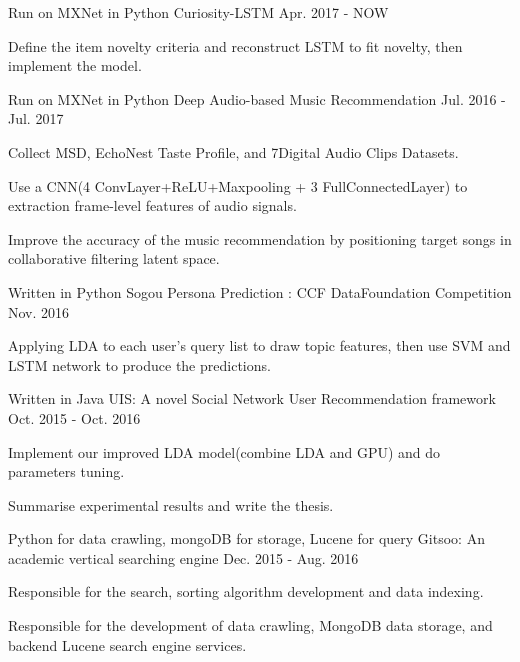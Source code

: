 \begin{cventries}
  \cventry
    {Run on MXNet in Python}
    {Curiosity-LSTM}
    {}
    {Apr. 2017 - NOW}
    {
      \begin{cvitems}
        \item {Define the item novelty criteria and reconstruct LSTM to fit novelty, then implement the model.}
      \end{cvitems}
    }
  \cventry
    {Run on MXNet in Python}
    {Deep Audio-based Music Recommendation}
    {}
    {Jul. 2016 - Jul. 2017}
    {
      \begin{cvitems}
        \item {Collect MSD, EchoNest Taste Profile, and 7Digital Audio Clips Datasets.}
        \item {Use a CNN(4 ConvLayer+ReLU+Maxpooling + 3 FullConnectedLayer) to extraction frame-level features of audio signals.}
        \item {Improve the accuracy of the music recommendation by positioning target songs in collaborative filtering latent space.}
      \end{cvitems}
    }
  \cventry
    {Written in Python}
    {Sogou Persona Prediction : CCF DataFoundation Competition}
    {}
    {Nov. 2016}
    {
      \begin{cvitems}
        \item {Applying LDA to each user's query list to draw topic features, then use SVM and LSTM network to produce the predictions.}
      \end{cvitems}
    }
  \cventry
    {Written in Java}
    {UIS: A novel Social Network User Recommendation framework}
    {}
    {Oct. 2015 - Oct. 2016}
    {
      \begin{cvitems}
        \item {Implement our improved LDA model(combine LDA and GPU) and do parameters tuning.}
        \item {Summarise experimental results and write the thesis.}
      \end{cvitems}
    }
  \cventry
    {Python for data crawling, mongoDB for storage, Lucene for query}
    {Gitsoo: An academic vertical searching engine}
    {}
    {Dec. 2015 - Aug. 2016}
    {
      \begin{cvitems}
        \item {Responsible for the search, sorting algorithm development and data indexing.}
        \item {Responsible for the development of data crawling, MongoDB data storage, and backend Lucene search engine services.}
      \end{cvitems}
    }
\end{cventries}